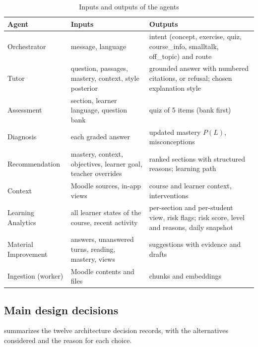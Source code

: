 \begin{table}[htbp]
\centering
\caption{Inputs and outputs of the agents}
\label{tab-agents-io}
\scriptsize
\begin{tabularx}{\textwidth}{@{}L{2.5cm}YY@{}}
\toprule
\textbf{Agent} & \textbf{Inputs} & \textbf{Outputs} \\
\midrule
Orchestrator & message, language & intent (concept, exercise, quiz, course\_info, smalltalk, off\_topic) and route \\
Tutor & question, passages, mastery, context, style posterior & grounded answer with numbered citations, or refusal; chosen explanation style \\
Assessment & section, learner language, question bank & quiz of 5 items (bank first) \\
Diagnosis & each graded answer & updated mastery $P(L)$, misconceptions \\
Recommendation & mastery, context, objectives, learner goal, teacher overrides & ranked sections with structured reasons; learning path \\
Context & Moodle sources, in-app views & course and learner context, interventions \\
Learning Analytics & all learner states of the course, recent activity & per-section and per-student view, risk flags; risk score, level and reasons, daily snapshot \\
Material Improvement & answers, unanswered turns, reading, mastery, views & suggestions with evidence and drafts \\
Ingestion (worker) & Moodle contents and files & chunks and embeddings \\
\bottomrule
\end{tabularx}
\end{table}

\subsection{Main design decisions}

 summarizes the twelve architecture decision records, with
the alternatives considered and the reason for each choice.

